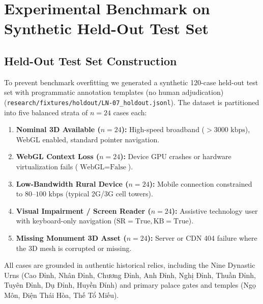 \documentclass[11pt,a4paper]{article}
\begin{document}
\section{Experimental Benchmark on Synthetic Held-Out Test Set}

\subsection{Held-Out Test Set Construction}
To prevent benchmark overfitting we generated a synthetic 120-case held-out test set with programmatic annotation templates (no human adjudication) (\texttt{research/fixtures/holdout/LN-07\_holdout.jsonl}). The dataset is partitioned into five balanced strata of $n = 24$ cases each:
\begin{enumerate}
    \item \textbf{Nominal 3D Available ($n=24$):} High-speed broadband ($>3000\text{ kbps}$), WebGL enabled, standard pointer navigation.
    \item \textbf{WebGL Context Loss ($n=24$):} Device GPU crashes or hardware virtualization fails ($\text{WebGL} = \text{False}$).
    \item \textbf{Low-Bandwidth Rural Device ($n=24$):} Mobile connection constrained to $80$--$100\text{ kbps}$ (typical 2G/3G cell towers).
    \item \textbf{Visual Impairment / Screen Reader ($n=24$):} Assistive technology user with keyboard-only navigation ($\text{SR} = \text{True}, \text{KB} = \text{True}$).
    \item \textbf{Missing Monument 3D Asset ($n=24$):} Server or CDN 404 failure where the 3D mesh is corrupted or missing.
\end{enumerate}
All cases are grounded in authentic historical relics, including the Nine Dynastic Urns (Cao Đỉnh, Nhân Đỉnh, Chương Đỉnh, Anh Đỉnh, Nghị Đỉnh, Thuần Đỉnh, Tuyên Đỉnh, Dụ Đỉnh, Huyền Đỉnh) and primary palace gates and temples (Ngọ Môn, Điện Thái Hòa, Thế Tổ Miếu).
\end{document}
